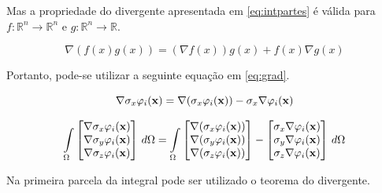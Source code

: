 \noindent{}

\vspace{1cm}



Mas a propriedade do divergente apresentada em \ref{eq:intpartes} é válida para $f:\mathbb{R}^n \rightarrow \mathbb{R}^n$ e $g:\mathbb{R}^n \rightarrow \mathbb{R}$.

\begin{equation} \label{eq:intpartes}
\nabla (f(x)g(x)) = (\nabla f(x)) g(x) + f(x)\nabla g(x)
\end{equation}


Portanto, pode-se utilizar a seguinte equação em \ref{eq:grad}.

\begin{equation}
\nabla \sigma_x \varphi_i(\mathbf{x}) = \nabla (\sigma_x \varphi_i(\mathbf{x})) - \sigma_x \nabla \varphi_i(\mathbf{x})
\end{equation}


\begin{equation}
\int\limits_{\Omega} 
\begin{bmatrix}
\nabla \sigma_x \varphi_i(\mathbf{x})\\ \nabla \sigma_y \varphi_i(\mathbf{x}) \\ \nabla \sigma_z \varphi_i(\mathbf{x})
\end{bmatrix} \, d\Omega = \int\limits_{\Omega} 
\begin{bmatrix}
\nabla (\sigma_x \varphi_i(\mathbf{x}))\\ \nabla (\sigma_y \varphi_i(\mathbf{x})) \\ \nabla (\sigma_z \varphi_i(\mathbf{x}))
\end{bmatrix}
-
\begin{bmatrix}
 \sigma_x \nabla \varphi_i(\mathbf{x})\\  \sigma_y \nabla \varphi_i(\mathbf{x}) \\  \sigma_z \nabla \varphi_i(\mathbf{x})
\end{bmatrix}
 \, d\Omega
\end{equation}

Na primeira parcela da integral pode ser utilizado o teorema do divergente.



